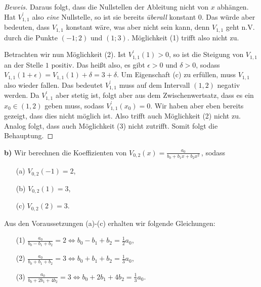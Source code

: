 \documentclass[a4paper]{article}
\begin{document}
\begin{proof}[Beweis]
    Daraus folgt, dass die Nullstellen der Ableitung nicht von $x$ abhängen. Hat $V_{1,1}^\prime$ also \textit{eine} 
    Nullstelle, so ist sie bereits \textit{überall} konstant $0$. Das würde aber bedeuten, dass $V_{1,1}$ konstant wäre, was aber
    nicht sein kann, denn $V_{1,1}$ geht n.V. durch die Punkte $(-1; 2)$ und $(1; 3)$. Möglichkeit (1) trifft also nicht zu.\par
    Betrachten wir nun Möglichkeit (2). Ist $V_{1,1}^\prime(1) > 0$, so ist die Steigung von $V_{1,1}$ an der Stelle $1$ positiv.
    Das heißt also, es gibt $\epsilon>0$ und $\delta>0$, sodass $V_{1,1}(1+\epsilon) = V_{1,1}(1) + \delta = 3 + \delta$.
    Um Eigenschaft (c) zu erfüllen, muss $V_{1,1}$ also wieder fallen. Das bedeutet $V_{1,1}^\prime$ muss auf dem Intervall 
    $(1,2)$ negativ werden. Da $V_{1,1}^\prime$ aber stetig ist, folgt aber aus dem Zwischenwertsatz, dass es ein $x_0\in (1,2)$ geben muss, sodass 
    $V_{1,1}^\prime(x_0) = 0$. Wir haben aber eben bereits gezeigt, dass dies nicht möglich ist. Also trifft auch Möglichkeit (2) nicht zu.
    Analog folgt, dass auch Möglichkeit (3) nicht zutrifft. Somit folgt die Behauptung.
\end{proof}

\textbf{b)} Wir berechnen die Koeffizienten von $V_{0,2}(x) = \frac{a_0}{b_0+b_1x+b_2x^2}$\,, sodass 
    \begin{itemize}
        \item[(a)] $V_{0,2}(-1) = 2$, 
        \item[(b)] $V_{0,2}(1) = 3$,
        \item[(c)] $V_{0,2}(2) = 3$. 
    \end{itemize}

    Aus den Voraussetzungen (a)-(c) erhalten wir folgende Gleichungen:
    \begin{itemize}
        \item[(1)] $\frac{a_0}{b_0-b_1+b_2} = 2  \Longleftrightarrow  b_0 - b_1 + b_2 = \frac{1}{2}a_0$,
        \item[(2)] $\frac{a_0}{b_0+b_1+b_2} = 3  \Longleftrightarrow  b_0 + b_1 + b_2 = \frac{1}{3}a_0$,
        \item[(3)] $\frac{a_0}{b_0+2b_1+4b_2} = 3 \Longleftrightarrow b_0 + 2b_1 + 4b_2 = \frac{1}{3}a_0$.  
    \end{itemize}
\end{document}

